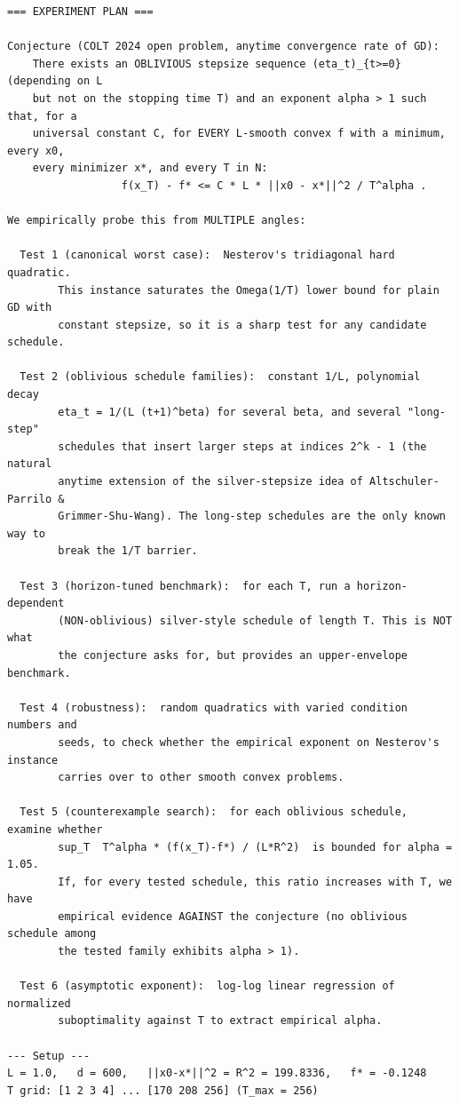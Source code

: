 \documentclass[11pt]{article}
\begin{document}
\begin{lstlisting}
=== EXPERIMENT PLAN ===

Conjecture (COLT 2024 open problem, anytime convergence rate of GD):
    There exists an OBLIVIOUS stepsize sequence (eta_t)_{t>=0} (depending on L
    but not on the stopping time T) and an exponent alpha > 1 such that, for a
    universal constant C, for EVERY L-smooth convex f with a minimum, every x0,
    every minimizer x*, and every T in N:
                  f(x_T) - f* <= C * L * ||x0 - x*||^2 / T^alpha .

We empirically probe this from MULTIPLE angles:

  Test 1 (canonical worst case):  Nesterov's tridiagonal hard quadratic.
        This instance saturates the Omega(1/T) lower bound for plain GD with
        constant stepsize, so it is a sharp test for any candidate schedule.

  Test 2 (oblivious schedule families):  constant 1/L, polynomial decay
        eta_t = 1/(L (t+1)^beta) for several beta, and several "long-step"
        schedules that insert larger steps at indices 2^k - 1 (the natural
        anytime extension of the silver-stepsize idea of Altschuler-Parrilo &
        Grimmer-Shu-Wang). The long-step schedules are the only known way to
        break the 1/T barrier.

  Test 3 (horizon-tuned benchmark):  for each T, run a horizon-dependent
        (NON-oblivious) silver-style schedule of length T. This is NOT what
        the conjecture asks for, but provides an upper-envelope benchmark.

  Test 4 (robustness):  random quadratics with varied condition numbers and
        seeds, to check whether the empirical exponent on Nesterov's instance
        carries over to other smooth convex problems.

  Test 5 (counterexample search):  for each oblivious schedule, examine whether
        sup_T  T^alpha * (f(x_T)-f*) / (L*R^2)  is bounded for alpha = 1.05.
        If, for every tested schedule, this ratio increases with T, we have
        empirical evidence AGAINST the conjecture (no oblivious schedule among
        the tested family exhibits alpha > 1).

  Test 6 (asymptotic exponent):  log-log linear regression of normalized
        suboptimality against T to extract empirical alpha.

--- Setup ---
L = 1.0,   d = 600,   ||x0-x*||^2 = R^2 = 199.8336,   f* = -0.1248
T grid: [1 2 3 4] ... [170 208 256] (T_max = 256)


\end{lstlisting}
\end{document}
